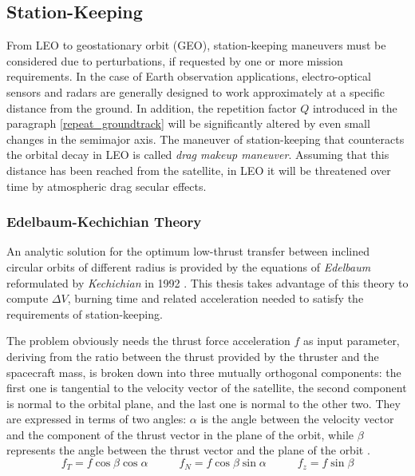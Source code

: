 \subsection{Station-Keeping}
From LEO to geostationary orbit (GEO), station-keeping maneuvers must be considered due to perturbations, if requested by one or more mission requirements.  
In the case of Earth observation applications, electro-optical sensors and radars are generally designed to work approximately at a specific distance from the ground. 
In addition, the repetition factor $Q$ introduced in the paragraph \ref{repeat_groundtrack} will be significantly altered by even small changes in the semimajor axis.
The maneuver of station-keeping that counteracts the orbital decay in LEO is called \textit{drag makeup maneuver}. 
Assuming that this distance has been reached from the satellite, in LEO it will be threatened over time by atmospheric drag secular effects.

\subsubsection{Edelbaum-Kechichian Theory}
An analytic solution for the optimum low-thrust transfer between inclined circular orbits of different radius is provided by the equations of \textit{Edelbaum} reformulated by \textit{Kechichian} in 1992 \cite{edelbaum1961propulsion, kechichian1992reformulation}.
This thesis takes advantage of this theory to compute $\Delta V$, burning time and related acceleration needed to satisfy the requirements of station-keeping.

The problem obviously needs the thrust force acceleration $f$ as input parameter, deriving from the ratio between the thrust provided by the thruster and the spacecraft mass, is broken down into three mutually orthogonal components:
the first one is tangential to the velocity vector of the satellite, the second component is normal to the orbital plane, and the last one is normal to the other two.
They are expressed in terms of two angles: 
$\alpha$ is the angle between the velocity vector and the component of the thrust vector in the plane of the orbit,
while $\beta$ represents the angle between the thrust vector and the plane of the orbit \cite{edelbaum1961propulsion}.
\begin{equation} \label{acceleration_thrust_components}
    f_T = f \cos{\beta} \cos{\alpha} \;\;\;\;\;\;\;\;\;\; f_N = f \cos{\beta} \sin{\alpha} \;\;\;\;\;\;\;\;\;\; f_z = f \sin{\beta}
\end{equation}

